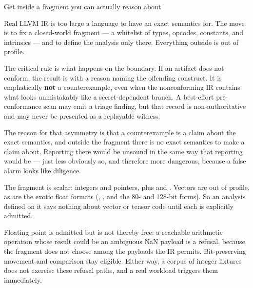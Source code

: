 \begin{step}{Get inside a fragment you can actually reason about}{%
}
\label{step:normalform}

Real LLVM IR is too large a language to have an exact semantics for. The move is
to fix a closed-world fragment --- a whitelist of types, opcodes, constants, and
intrinsics --- and to define the analysis only there. Everything outside is out
of profile.

The critical rule is what happens on the boundary. If an artifact does not
conform, the result is \Unknown{} with a reason naming the offending construct.
It is emphatically \textbf{not} a counterexample, even when the nonconforming IR
contains what looks unmistakably like a secret-dependent branch. A best-effort
pre-conformance scan may emit a triage finding, but that record is
non-authoritative and may never be presented as a replayable witness.

The reason for that asymmetry is that a counterexample is a claim about the
exact semantics, and outside the fragment there is no exact semantics to make a
claim about. Reporting \Unsafe{} there would be unsound in the same way that
reporting \Verified{} would be --- just less obviously so, and therefore more
dangerous, because a false alarm looks like diligence.

\begin{remark}
The fragment is scalar: integers and pointers, plus  and
. Vectors are out of profile, as are the exotic float formats
(, , and the 80- and 128-bit forms). So an analysis
defined on it says nothing about vector or tensor code until each is explicitly
admitted.

Floating point is admitted but is not thereby free: a reachable arithmetic
operation whose result could be an ambiguous NaN payload is a refusal, because
the fragment does not choose among the payloads the IR permits. Bit-preserving
movement and comparison stay eligible. Either way, a corpus of integer fixtures
does not exercise these refusal paths, and a real workload triggers them
immediately.
\end{remark}
\end{step}

